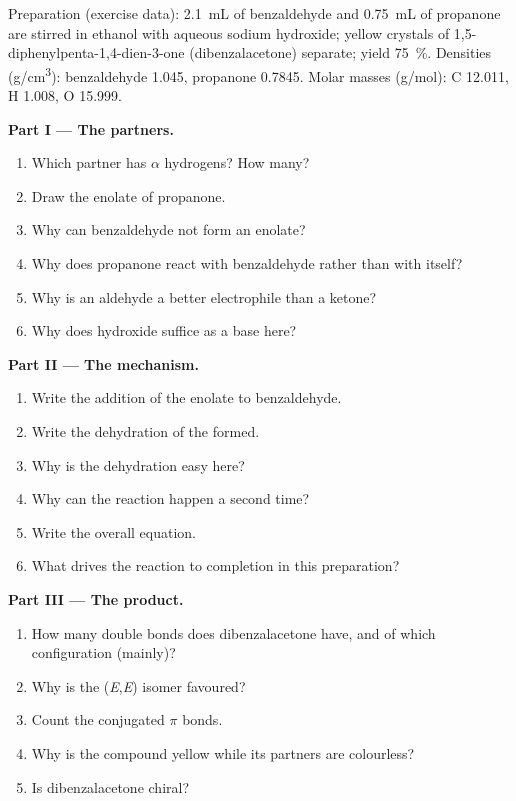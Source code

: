 \begin{problem}
\label{pb:b2:enolates-aldol:1}
Preparation (exercise data): \qty{2.1}{mL} of benzaldehyde and \qty{0.75}{mL} of propanone are stirred
in ethanol with aqueous sodium hydroxide; yellow crystals of 1,5-diphenylpenta-1,4-dien-3-one
(dibenzalacetone) separate; yield 75~\%. Densities (\unit{g/cm^3}): benzaldehyde 1.045, propanone 0.7845.
Molar masses (\unit{g/mol}): C 12.011, H 1.008, O 15.999.

\medskip
\noindent\textbf{Part I --- The partners.}
\begin{enumerate}
  \item Which partner has $\alpha$ hydrogens? How many?
  \item Draw the enolate of propanone.
  \item Why can benzaldehyde not form an enolate?
  \item Why does propanone react with benzaldehyde rather than with itself?
  \item Why is an aldehyde a better electrophile than a ketone?
  \item Why does hydroxide suffice as a base here?
\end{enumerate}

\medskip
\noindent\textbf{Part II --- The mechanism.}
\begin{enumerate}[resume]
  \item Write the addition of the enolate to benzaldehyde.
  \item Write the dehydration of the  formed.
  \item Why is the dehydration easy here?
  \item Why can the reaction happen a second time?
  \item Write the overall equation.
  \item What drives the reaction to completion in this preparation?
\end{enumerate}

\medskip
\noindent\textbf{Part III --- The product.}
\begin{enumerate}[resume]
  \item How many  double bonds does dibenzalacetone have, and of which configuration (mainly)?
  \item Why is the (\textit{E},\textit{E}) isomer favoured?
  \item Count the conjugated $\pi$ bonds.
  \item Why is the compound yellow while its partners are colourless?
  \item Is dibenzalacetone chiral?
\end{enumerate}


\end{problem}
